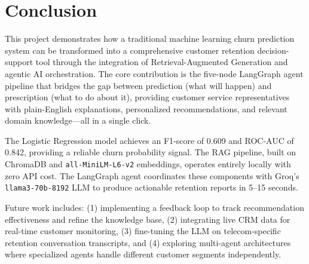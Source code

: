\section{Conclusion}

This project demonstrates how a traditional machine learning churn prediction system can be
transformed into a comprehensive customer retention decision-support tool through the
integration of Retrieval-Augmented Generation and agentic AI orchestration. The core
contribution is the five-node LangGraph agent pipeline that bridges the gap between
prediction (what will happen) and prescription (what to do about it), providing customer
service representatives with plain-English explanations, personalized recommendations,
and relevant domain knowledge---all in a single click.

The Logistic Regression model achieves an F1-score of 0.609 and ROC-AUC of 0.842, providing
a reliable churn probability signal. The RAG pipeline, built on ChromaDB and
\texttt{all-MiniLM-L6-v2} embeddings, operates entirely locally with zero API cost. The
LangGraph agent coordinates these components with Groq's \texttt{llama3-70b-8192} LLM to
produce actionable retention reports in 5--15 seconds.

Future work includes: (1) implementing a feedback loop to track recommendation effectiveness
and refine the knowledge base, (2) integrating live CRM data for real-time customer
monitoring, (3) fine-tuning the LLM on telecom-specific retention conversation transcripts,
and (4) exploring multi-agent architectures where specialized agents handle different
customer segments independently.
